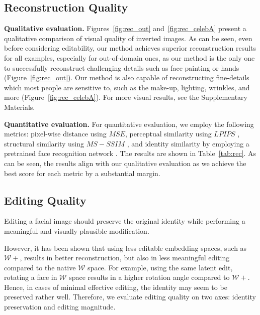 \subsection{ Reconstruction Quality}
\label{sec:recon_quality}

{\bf Qualitative evaluation.} Figures~\ref{fig:rec_out} and~\ref{fig:rec_celebA} present a qualitative comparison of visual quality of inverted images. As can be seen, even before considering editability, our method achieves superior reconstruction results for all examples, especially for out-of-domain ones, as our method is the only one to successfully reconstruct challenging details such as face painting or hands (Figure~\ref{fig:rec_out}).
Our method is also capable of reconstructing fine-details which most people are sensitive to, such as the make-up, lighting, wrinkles, and more (Figure~\ref{fig:rec_celebA}). For more visual results, see the Supplementary Materials.

{\bf Quantitative evaluation.} For quantitative evaluation, we employ the following metrics: pixel-wise distance using $MSE$, perceptual similarity using $LPIPS$ \cite{zhang2018unreasonable},  structural similarity using $MS-SSIM$ \cite{wang2003multiscale}, and identity similarity by employing a pretrained face recognition network \cite{deng2019arcface}. The results are shown in Table~\ref{tab:rec}. As can be seen, the results align with our qualitative evaluation as we achieve the best score for each metric by a substantial margin.

\subsection{Editing Quality}

Editing a facial image should preserve the original identity while performing a meaningful and visually plausible modification. 

However, it has been shown \cite{zhu2020improved, tov2021designing} that using less editable embedding spaces, such as $\mathcal{W+}$, results in better reconstruction, but also in less meaningful editing compared to the native $\mathcal{W}$ space. For example, using the same latent edit, rotating a face in $\mathcal{W}$ space results in a higher rotation angle compared to $\mathcal{W+}$. Hence, in cases of minimal effective editing, the identity may seem to be preserved rather well. Therefore, we evaluate editing quality on two axes: identity preservation and editing magnitude. 

